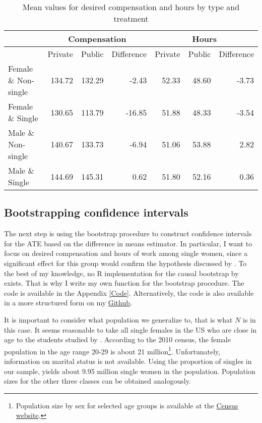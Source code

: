\documentclass[aodsor,preprint]{imsart}
\numberwithin{equation}{section}
\theoremstyle{plain}
\begin{document}
\begin{table}[!h]
	\centering
	\caption{Mean values for desired compensation and hours by type and treatment}
	\label{mean values}
	\begin{tabular}{l|r|r|r|r|r|r}
		\hline
		& \multicolumn{3}{c|}{Compensation} & \multicolumn{3}{|c}{Hours} \\
		\hline
		& Private & Public & Difference & Private & Public & Difference \\
		\hline
		Female \& Non-single & 134.72 & 132.29 & -2.43 & 52.33 & 48.60 & -3.73\\
		Female \& Single & 130.65 & 113.79 & -16.85 & 51.88 & 48.33 & -3.54\\
		Male \& Non-single & 140.67 & 133.73 & -6.94 & 51.06 & 53.88 & 2.82\\
		Male \& Single & 144.69 & 145.31 & 0.62 & 51.80 & 52.16 & 0.36\\
		\hline
	\end{tabular}
\end{table}


\subsection{Bootstrapping confidence intervals}

The next step is using the bootstrap procedure to construct confidence intervals for the ATE based on the difference in means estimator. In particular, I want to focus on desired compensation and hours of work among single women, since a significant effect for this group would confirm the hypothesis discussed by \cite{Bursztyn_2017}. To the best of my knowledge, no R implementation for the causal bootstrap by \cite{Imbens_2021} exists. That is why I write my own function for the bootstrap procedure. The code is available in the Appendix \ref{Code}. Alternatively, the code is also available in a more structured form on my \href{https://github.com/gregorsteiner/CausalBootstrap}{Github}.

It is important to consider what population we generalize to, that is what $N$ is in this case. It seems reasonable to take all single females in the US who are close in age to the students studied by \cite{Bursztyn_2017}. According to the 2010 census, the female population in the age range 20-29 is about 21 million\footnote{Population size by sex for selected age groups is available at the \href{https://www.census.gov/data/tables/time-series/demo/popest/2010s-national-detail.html}{Census website}.}. Unfortunately, information on marital status is not available. Using the proportion of singles in our sample, yields about 9.95 million single women in the population. Population sizes for the other three classes can be obtained analogously.
\end{document}
